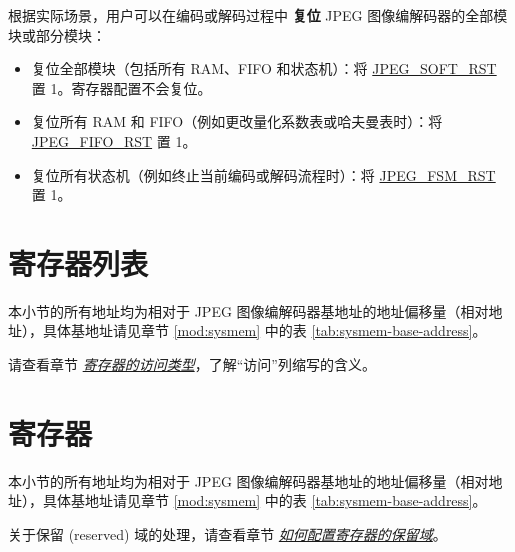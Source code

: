 \documentclass[main\_\_CN.tex]{subfiles}
\begin{document}
根据实际场景，用户可以在编码或解码过程中 \textbf{复位} JPEG 图像编解码器的全部模块或部分模块：
\begin{itemize}
    \item 复位全部模块（包括所有 RAM、FIFO 和状态机）：将 \hyperref[fielddesc:JPEGSOFTRST]{JPEG\_SOFT\_RST} 置 1。寄存器配置不会复位。
    \item 复位所有 RAM 和 FIFO（例如更改量化系数表或哈夫曼表时）：将 \hyperref[fielddesc:JPEGFIFORST]{JPEG\_FIFO\_RST} 置 1。
    \item 复位所有状态机（例如终止当前编码或解码流程时）：将 \hyperref[fielddesc:JPEGFSMRST]{JPEG\_FSM\_RST} 置 1。
\end{itemize}




\newpage
\hypertarget{jpegcodec-reg-summ}{}
\section{寄存器列表}
\label{sec:jpegcodec-reg-summ}

本小节的所有地址均为相对于 JPEG 图像编解码器基地址的地址偏移量（相对地址），具体基地址请见章节 \ref{mod:sysmem} \textit{} 中的表 \ref{tab:sysmem-base-address}。

请查看章节 \hyperref[glossary-access-types]{\textit{寄存器的访问类型}}，了解“访问”列缩写的含义。






\newpage
\section{寄存器}

本小节的所有地址均为相对于 JPEG 图像编解码器基地址的地址偏移量（相对地址），具体基地址请见章节 \ref{mod:sysmem} \textit{} 中的表 \ref{tab:sysmem-base-address}。

关于保留 (reserved) 域的处理，请查看章节 \hyperref[programming-reserved-field]{\textit{如何配置寄存器的保留域}}。



\end{document}

